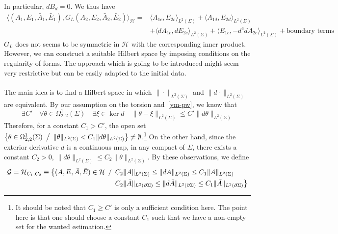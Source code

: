 In particular, $d B_d = 0$. 
We thus have 
\begin{equation*}
\begin{split}
\langle (A_1,E_1,\bar{A}_1,\bar{E}_1), G_L(A_2,E_2,\bar{A}_2,\bar{E}_2) \rangle_{\mathcal{H}} = &
\langle A_{1c}, E_{2c} \rangle_{L^2(\Sigma)} + \langle A_{1d}, E_{2d} \rangle_{L^2(\Sigma)} \\
&+ \langle d A_{1c}, d E_{2c} \rangle_{L^2(\Sigma)}
+ \langle E_{1c}, -d^c d A_{2c}\rangle_{L^2(\Sigma)} 
 + \textrm{boundary terms}
\end{split}
\end{equation*}
$G_L$ does not seems to be symmetric in $\mathcal{H}$ with the corresponding inner product. 
However, we can construct a suitable Hilbert space by imposing conditions on the regularity of forms. 
The approach which is going to be introduced might seem very restrictive but can be easily adapted to the initial data.\\\\
The main idea is to find a Hilbert space in which $\| \cdot \|_{L^2(\Sigma)}$ and $\| d \cdot \|_{L^2(\Sigma)}$ are equivalent. 
By our assumption on the torsion and~\cref{ym-pw}, we know that
\begin{equation*}
\exists C' \quad
\forall \theta \in \Omega^1_{2,2}(\Sigma) \quad
\exists\xi\in\ker d\quad
\| \theta - \xi \|_{L^2(\Sigma)}\leq C' \| d \theta \|_{L^2(\Sigma)}
\end{equation*}
Therefore, for a constant $C_1 > C'$, the open set $\big\{\theta\in\Omega^1_{2,2}(\Sigma) \enskip \big/\enskip \|\theta \|_{L^2(\Sigma)} < C_1\|d \theta \|_{L^2(\Sigma)} \big\} \neq \emptyset$.\footnote{ 
It should be noted that $C_1 \geq C'$ is only a sufficient condition here. 
The point here is that one should choose a constant $C_1$ such that we have a non-empty set for the wanted estimation.
}
On the other hand, since the exterior derivative $d$ is a continuous map, in any compact of $\Sigma$, there exists a constant $C_2 >0$, $\| d \theta \|_{L^2(\Sigma)} \leq C_2 \| \theta \|_{L^2(\Sigma)}$. 
By these observations, we define 
\begin{equation*}
\begin{split}
\mathcal{G} = \mathcal{H}_{C_1, C_2} \equiv\big\{ (A,E,\bar{A},\bar{E}) \in \mathcal{H} \enskip/\enskip &
C_2 \|A\|_{L^2(\Sigma)} \leq \| d A \|_{L^2(\Sigma)} \leq C_1\| A\|_{L^2({\Sigma})} \\
& C_2 \|\bar{A}\|_{L^2(\partial\Sigma)} \leq \| d \bar{A} \|_{L^2(\partial\Sigma)} \leq C_1\| \bar{A}\|_{L^2({\partial\Sigma})} \big\}
\end{split}
\end{equation*}
